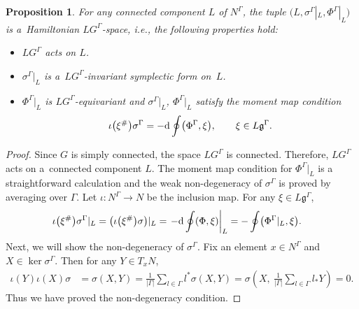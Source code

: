 \documentclass[pdftex]{sigma}
\numberwithin{equation}{section}
\newtheorem{Proposition}[Theorem]{Proposition}
\theoremstyle{definition}
\begin{document}
\begin{Proposition}
 For any connected component $L$ of $N^{\Gamma}$, the tuple
 $\bigl(L, \sigma^{\Gamma}|_L, \Phi^{\Gamma}|_L\bigr)$ is a~Hamiltonian $LG^{\Gamma}$-space, i.e., the following properties hold:
\begin{itemize}\itemsep=0pt
 \item $LG^{\Gamma}$ acts on $L$.
 \item $\sigma^{\Gamma}|_L$ is a~$LG^{\Gamma}$-invariant symplectic form on~$L$.
 \item $\Phi^{\Gamma}|_L$ is $LG^{\Gamma}$-equivariant and $\sigma^{\Gamma}|_L$, $\Phi^{\Gamma}|_L$ satisfy the moment map condition
 \[\iota\bigl(\xi^{\#}\bigr)\sigma^{\Gamma} = - {\rm d} \oint \bigl(\Phi^{\Gamma},\xi\bigr), \qquad \xi \in L\mathfrak{g}^{\Gamma}.\]
 \end{itemize}
\end{Proposition}

\begin{proof}
 Since $G$ is simply connected, the space $LG^{\Gamma}$ is connected.
 Therefore, $LG^{\Gamma}$ acts on a~connected component $L$.
 The moment map condition for $\Phi^{\Gamma}|_L$ is a straightforward calculation and
 the weak non-degeneracy of $\sigma^{\Gamma}$ is proved by averaging over $\Gamma$.
 Let $\iota \colon N^{\Gamma} \to N$ be the inclusion map.
 For any $\xi \in L\mathfrak{g}^{\Gamma}$,
 \begin{align*}
 \iota\bigl(\xi^{\#}\bigr)\sigma^{\Gamma}|_L &= \bigl(\iota\bigl(\xi^{\#}\bigr)\sigma\bigr)|_{L} = \left. -{\rm d} \oint (\Phi,\xi) \right|_{L} = - \oint \bigl(\Phi^{\Gamma} |_{L},\xi \bigr).
 \end{align*}
 Next, we will show the non-degeneracy of $\sigma^{\Gamma}$.
 Fix an element $x \in N^{\Gamma}$ and $X \in \ker\sigma^{\Gamma}$.
 Then for any $Y \in T_xN$,
 \begin{align*}
 \iota(Y)\iota(X) \sigma &= \sigma(X,Y)= \frac{1}{|\Gamma|}\sum_{l \in \Gamma} l^*\sigma(X,Y) = \sigma\left( X,\ \frac{1}{|\Gamma|} \sum_{l \in \Gamma}l_*Y \right)
 = 0.
 \end{align*}
 Thus we have proved the non-degeneracy condition.
\end{proof}
\end{document}
